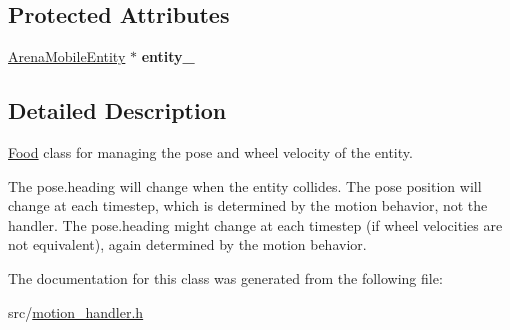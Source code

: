 \subsection*{Protected Attributes}
\begin{DoxyCompactItemize}
\item 
\mbox{\label{class_motion_handler_a659fd1ec8878260a63779bf45681f5a4}} 
\mbox{\hyperlink{class_arena_mobile_entity}{Arena\+Mobile\+Entity}} $\ast$ {\bfseries entity\+\_\+}
\end{DoxyCompactItemize}


\subsection{Detailed Description}
\mbox{\hyperlink{class_food}{Food}} class for managing the pose and wheel velocity of the entity. 

The pose.\+heading will change when the entity collides. The pose position will change at each timestep, which is determined by the motion behavior, not the handler. The pose.\+heading might change at each timestep (if wheel velocities are not equivalent), again determined by the motion behavior. 

The documentation for this class was generated from the following file\+:\begin{DoxyCompactItemize}
\item 
src/\mbox{\hyperlink{motion__handler_8h}{motion\+\_\+handler.\+h}}\end{DoxyCompactItemize}
